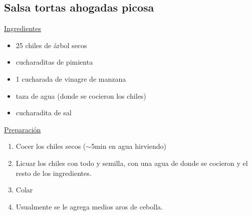 \subsection{Salsa tortas ahogadas picosa}

\underline{Ingredientes}
\begin{itemize}
\item 25 chiles de \'arbol secos
\item {} cucharaditas de pimienta
\item 1 cucharada de vinagre de manzana
\item {} taza de agua (donde se cocieron los chiles)
\item {} cucharadita de sal
\end{itemize}

\underline{Preparación}
\begin{enumerate}
\item Cocer los chiles secos ($\sim$5min en agua hirviendo)
\item Licuar los chiles con todo y semilla, con una agua de donde se cocieron y el resto de los ingredientes.
\item Colar
\item Usualmente se le agrega medios aros de cebolla.
\end{enumerate}
